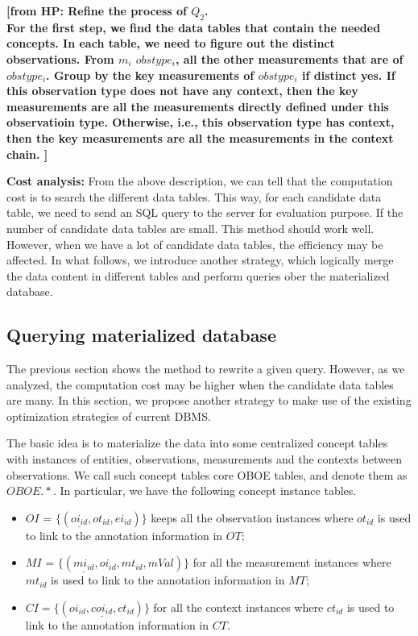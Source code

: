 \documentclass[conference]{IEEEtran}
\newcommand{\from}[2]{{\bf[{\sc from #1:} #2]}}
\begin{document}
\from{HP}{Refine the process of $Q_2$.\\
For the first step, we find the data tables that contain the needed concepts. 
In each table, we need to figure out the distinct observations. 
From $m_i$ $obstype_i$, all the other measurements that are of
$obstype_i$. 
Group by the key measurements of $obstype_i$ if distinct yes.
If this observation type does not have any context, then the key
measurements are all the measurements directly defined under this
observatioin type. Otherwise, i.e., this observation type has context,
then the key measurements are all the measurements in the context
chain. }


{\bf Cost analysis:} 
From the above description, we can tell that the computation cost is to search the different data
tables. This way, for each candidate data table, we need to send an
SQL query to the server for evaluation purpose.
If the number of candidate data tables are small. This method should
work well. However, when we have a lot of candidate data tables, the
efficiency may be affected. 
In what follows, we introduce another strategy, which logically merge
the data content in different tables and perform queries ober the
materialized database. 

\subsection{Querying materialized database}\label{sec:matdb}

The previous section shows the method to rewrite a given query. 
However, as we analyzed, the computation cost may be higher when the
candidate data tables are many. In this section, we propose another
strategy to make use of the existing optimization strategies of
current DBMS. 

The basic idea is to materialize the data into some centralized
concept tables with instances of entities, observations, measurements
and the contexts between observations. 
We call such concept tables core OBOE tables, and denote them as
$OBOE.*$. 
In particular, we have the following concept instance tables. 
\begin{itemize}
\item $OI$ = $\{(\underline{oi_{id}}, ot_{id}, ei_{id})\}$ keeps
  all the observation instances where $ot_{id}$ is used to link to the
  annotation information in $OT$; 
\item $MI$ = $\{(\underline{mi_{id}}, oi_{id}, mt_{id},
  mVal)\}$ for all the measurement instances where $mt_{id}$ is used to link to the
  annotation information in $MT$; 
\item $CI =\{(\underline{oi_{id},coi_{id},ct_{id}})\}$ for
  all the context instances where $ct_{id}$ is used to link to the
  annotation information in $CT$. 
\end{itemize}
\end{document}
